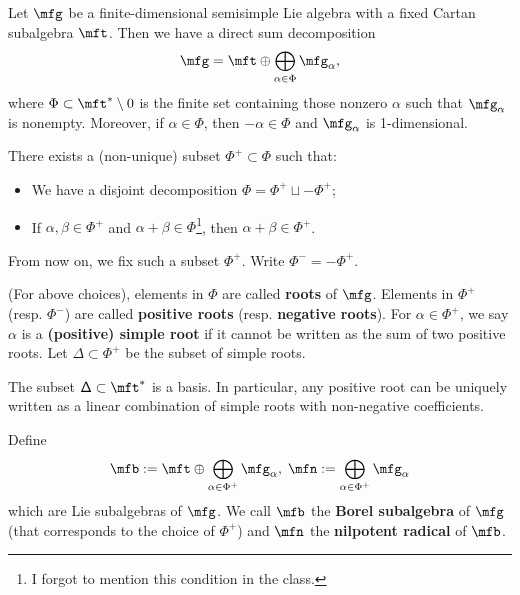 \begin{prop}
	Let $\mfg$ be a finite-dimensional semisimple Lie algebra with a fixed Cartan subalgebra $\mft$. Then we have a direct sum decomposition
	\[
		\mfg = \mft \oplus \bigoplus_{\alpha\in \Phi} \mfg_\alpha,
	\]
	where $\Phi\subset \mft^*\setminus 0$ is the finite set containing those nonzero $\alpha$ such that $\mfg_\alpha$ is nonempty. Moreover, if $\alpha\in \Phi$, then $-\alpha \in \Phi$ and $\mfg_\alpha$ is 1-dimensional.
\end{prop}

\begin{prop}
	There exists a (non-unique) subset $\Phi^+ \subset \Phi$ such that:
	\begin{itemize}
		\item 
			We have a disjoint decomposition $\Phi = \Phi^+ \sqcup -\Phi^+$;
		\item
			If $\alpha,\beta\in \Phi^+$ and $\alpha+\beta\in \Phi$\footnote{I forgot to mention this condition in the class.
			}, then $\alpha+\beta\in \Phi^+$.
	\end{itemize}
\end{prop}

\begin{notn}
	From now on, we fix such a subset $\Phi^+$. Write $\Phi^- = -\Phi^+$.
\end{notn}

\begin{defn}
	(For above choices), elements in $\Phi$ are called \textbf{roots} of $\mfg$. Elements in $\Phi^+$ (resp. $\Phi^-$) are called \textbf{positive roots} (resp. \textbf{negative roots}). For $\alpha\in \Phi^+$, we say $\alpha$ is a \textbf{(positive) simple root} if it cannot be written as the sum of two positive roots. Let $\mathsf{\Delta} \subset \Phi^+$ be the subset of simple roots.
\end{defn}

\begin{prop}
	The subset $\mathsf{\Delta} \subset \mft^*$ is a basis. In particular, any positive root can be uniquely written as a linear combination of simple roots with non-negative coefficients.
\end{prop}

\begin{defn}
	Define 
	\[
		\mfb:= \mft \oplus \bigoplus_{\alpha\in \Phi^+} \mfg_\alpha,\; \mfn:= \bigoplus_{\alpha\in \Phi^+} \mfg_\alpha
	\]
	which are Lie subalgebras of $\mfg$. We call $\mfb$ the \textbf{Borel subalgebra} of $\mfg$ (that corresponds to the choice of $\Phi^+$) and $\mfn$ the \textbf{nilpotent radical} of $\mfb$.
\end{defn}

